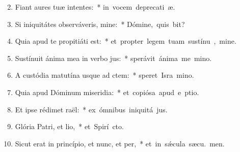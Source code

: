 \begin{flushleft}
\begin{enumerate}[leftmargin=*]
\setcounter{enumi}{1}


\item Fiant aures tuæ intentes:~* \mbox{in vocem deprecati æ.}
\item Si iniquitátes observáveris, mine:~* \mbox{Dómine, quis bit?}
\item Quia apud te propitiáti est:~* \mbox{et propter legem tuam sustínu , mine.}
\item Sustínuit ánima mea in verbo jus:~* \mbox{sperávit ánima me  mino.}
\item A custódia matutína usque ad ctem:~* \mbox{speret Isra  mino.}
\item Quia apud Dóminum miseridia:~* \mbox{et copiósa apud e ptio.}
\item Et ipse rédimet raël:~* \mbox{ex ómnibus iniquitá jus.}
\item Glória Patri, et lio,~* \mbox{et Spirí cto.}
\item Sicut erat in princípio, et nunc, et per,~* \mbox{et in s\'{\ae}cula sæcu. men.}


\end{enumerate}
\end{flushleft}

